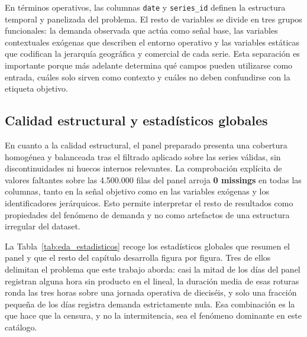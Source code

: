 En términos operativos, las columnas \texttt{date} y \texttt{series\_id} definen la estructura temporal y panelizada del problema. El resto de variables se divide en tres grupos funcionales: la demanda observada que actúa como señal base, las variables contextuales exógenas que describen el entorno operativo y las variables estáticas que codifican la jerarquía geográfica y comercial de cada serie. Esta separación es importante porque más adelante determina qué campos pueden utilizarse como entrada, cuáles solo sirven como contexto y cuáles no deben confundirse con la etiqueta objetivo.

\subsection{Calidad estructural y estadísticos globales}

En cuanto a la calidad estructural, el panel preparado presenta una cobertura homogénea y balanceada tras el filtrado aplicado sobre las series válidas, sin discontinuidades ni huecos internos relevantes. La comprobación explícita de valores faltantes sobre las 4.500.000 filas del panel arroja \textbf{0 missings} en todas las columnas, tanto en la señal objetivo como en las variables exógenas y los identificadores jerárquicos. Esto permite interpretar el resto de resultados como propiedades del fenómeno de demanda y no como artefactos de una estructura irregular del dataset.

La Tabla~\ref{tab:eda_estadisticos} recoge los estadísticos globales que resumen el panel y que
el resto del capítulo desarrolla figura por figura. Tres de ellos delimitan el problema que este
trabajo aborda: casi la mitad de los días del panel registran alguna hora sin producto en el
lineal, la duración media de esas roturas ronda las tres horas sobre una jornada operativa de
dieciséis, y solo una fracción pequeña de los días registra demanda estrictamente nula. Esa
combinación es la que hace que la censura, y no la intermitencia, sea el fenómeno dominante en
este catálogo.

